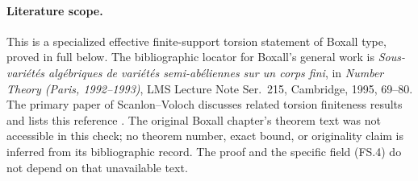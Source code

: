 \paragraph{Literature scope.}
This is a specialized effective finite-support torsion statement
of Boxall type, proved in full below. The bibliographic locator
for Boxall's general work is
\emph{Sous-vari\'et\'es alg\'ebriques de vari\'et\'es
semi-ab\'eliennes sur un corps fini}, in \emph{Number Theory
(Paris, 1992--1993)}, LMS Lecture Note Ser.~215, Cambridge, 1995,
69--80. The primary paper of Scanlon--Voloch discusses related torsion
finiteness results and lists this reference
\cite[Introduction and reference \textnormal{[Box]}]{ScanlonVoloch1999}.
The original Boxall chapter's theorem text was not accessible in
this check; no theorem number, exact bound, or originality claim
is inferred from its bibliographic record. The proof and the
specific field (FS.4) do not depend on that unavailable text.

